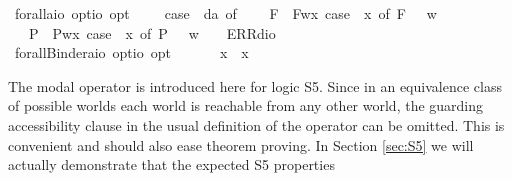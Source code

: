 \begin{isabellebody}
\ forall{\isacharcolon}{\isacharcolon}{\isachardoublequoteopen}{\isacharparenleft}{\isacharprime}a{\isasymRightarrow}io\ opt{\isacharparenright}{\isasymRightarrow}io\ opt{\isachardoublequoteclose}\ {\isacharparenleft}{\isachardoublequoteopen}\isactrlbold {\isasymforall}{\isachardoublequoteclose}{\isacharparenright}\ \ {\isachardoublequoteopen}\isactrlbold {\isasymforall}{\isasymPhi}\ {\isasymequiv}\ case\ {\isacharparenleft}{\isasymPhi}\ da{\isacharparenright}\ of\isanewline
\ \ \ \ F{\isacharparenleft}{\isasymphi}{\isacharparenright}\ {\isasymRightarrow}\ F{\isacharparenleft}{\isasymlambda}w{\isachardot}{\isasymforall}x{\isachardot}\ case\ {\isacharparenleft}{\isasymPhi}\ x{\isacharparenright}\ of\ F{\isacharparenleft}{\isasympsi}{\isacharparenright}\ {\isasymRightarrow}\ {\isasympsi}\ w{\isacharparenright}\ \isanewline
\ \ {\isacharbar}\ P{\isacharparenleft}{\isasymphi}{\isacharparenright}\ {\isasymRightarrow}\ P{\isacharparenleft}{\isasymlambda}w{\isachardot}{\isasymforall}x{\isachardot}\ case\ {\isacharparenleft}{\isasymPhi}\ x{\isacharparenright}\ of\ P{\isacharparenleft}{\isasympsi}{\isacharparenright}\ {\isasymRightarrow}\ {\isasympsi}\ w{\isacharparenright}\ {\isacharbar}\ {\isacharunderscore}\ {\isasymRightarrow}\ ERR{\isacharparenleft}dio{\isacharparenright}{\isachardoublequoteclose}\isanewline
\ \isamarkupfalse%
\ forallBinder{\isacharcolon}{\isacharcolon}{\isachardoublequoteopen}{\isacharparenleft}{\isacharprime}a{\isasymRightarrow}io\ opt{\isacharparenright}{\isasymRightarrow}io\ opt{\isachardoublequoteclose}\ {\isacharparenleft}\ {\isachardoublequoteopen}\isactrlbold {\isasymforall}{\isachardoublequoteclose}\ {\isacharbrackleft}{}{\isacharbrackright}\ {}{\isacharparenright}\ \ \ {\isachardoublequoteopen}\isactrlbold {\isasymforall}x{\isachardot}\ {\isasymphi}\ x\ {\isasymequiv}\ \isactrlbold {\isasymforall}\ {\isasymphi}{\isachardoublequoteclose}\isanewline
\isanewline
\ %
\isadelimproof
%
\endisadelimproof
%
\isatagproof
%
\endisatagproof
{\isafoldproof}%
%
\isadelimproof
%
\endisadelimproof
%
\begin{isamarkuptext}%
The modal \isa{\isactrlbold {\isasymbox}} operator is introduced here for logic S5. Since in an equivalence class
  of possible worlds each world is reachable from any other world, the guarding accessibility clause
  in the usual definition of the \isa{\isactrlbold {\isasymbox}} operator can be omitted. This is convenient and should also
  ease theorem proving. In Section \ref{sec:S5} we will actually demonstrate that the expected S5 properties

\end{isamarkuptext}
\end{isabellebody}
